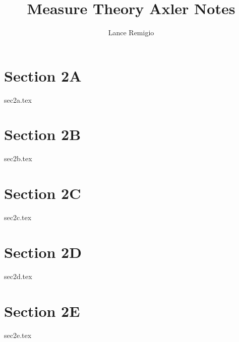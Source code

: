 \documentclass[a4paper]{article}
\title{Measure Theory Axler Notes}
\author{Lance Remigio}
\begin{document}
\maketitle
\tableofcontents

\section{Section 2A}

{sec2a.tex}

\section{Section 2B}

{sec2b.tex}

\section{Section 2C}

{sec2c.tex}

\section{Section 2D}

{sec2d.tex}

\section{Section 2E}

{sec2e.tex}
\end{document}
